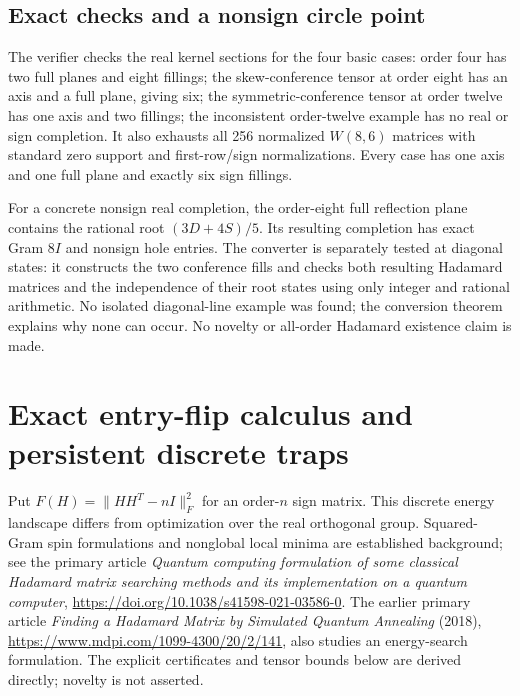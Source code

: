 \documentclass[11pt]{article}
\begin{document}
\subsection{Exact checks and a nonsign circle point}
The verifier checks the real kernel sections for the four basic
cases: order four has two full planes and eight fillings; the
skew-conference tensor at order eight has an axis and a full plane,
giving six; the symmetric-conference tensor at order twelve has
one axis and two fillings; the inconsistent order-twelve example
has no real or sign completion. It also exhausts all 256 normalized
$W(8,6)$ matrices with standard zero support and first-row/sign
normalizations. Every case has one axis and one full plane and
exactly six sign fillings.

For a concrete nonsign real completion, the order-eight full
reflection plane contains the rational root $(3D+4S)/5$.
Its resulting completion has exact Gram $8I$ and nonsign hole
entries. The converter is separately tested at diagonal states:
it constructs the two conference fills and checks both resulting
Hadamard matrices and the independence of their root states using
only integer and rational arithmetic. No isolated diagonal-line
example was found; the conversion theorem explains why none can
occur. No novelty or all-order Hadamard existence claim is made.
\section{Exact entry-flip calculus and persistent discrete traps}
\label{sec:spectral-flip-traps}
Put $F(H)=\|HH^T-nI\|_F^2$ for an order-$n$ sign matrix.
This discrete energy landscape differs from optimization over the real
orthogonal group. Squared-Gram spin formulations and nonglobal local
minima are established background; see the primary article
\emph{Quantum computing formulation of some classical Hadamard matrix
searching methods and its implementation on a quantum computer},
\url{https://doi.org/10.1038/s41598-021-03586-0}.
The earlier primary article \emph{Finding a Hadamard Matrix by Simulated
Quantum Annealing} (2018), \url{https://www.mdpi.com/1099-4300/20/2/141},
also studies an energy-search formulation.
The explicit certificates and tensor bounds below are derived directly;
novelty is not asserted.
\end{document}
